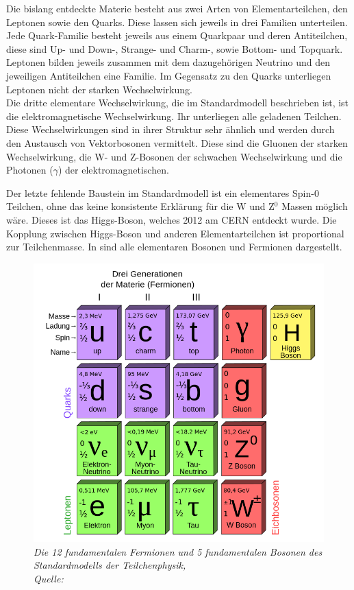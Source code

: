 Die bislang entdeckte Materie besteht aus zwei Arten von Elementarteilchen, den Leptonen sowie den Quarks. Diese lassen sich jeweils in drei Familien unterteilen. Jede Quark-Familie besteht jeweils aus einem Quarkpaar und deren Antiteilchen, diese sind Up- und Down-, Strange- und Charm-, sowie Bottom- und Topquark.\\
Leptonen bilden jeweils zusammen mit dem dazugeh\"origen Neutrino und den jeweiligen Antiteilchen eine Familie. Im Gegensatz zu den Quarks unterliegen Leptonen nicht der starken Wechselwirkung.\\
Die dritte elementare Wechselwirkung, die im Standardmodell beschrieben ist, ist die elektromagnetische Wechselwirkung. Ihr unterliegen alle geladenen Teilchen. Diese Wechselwirkungen sind in ihrer Struktur sehr \"ahnlich und werden durch den Austausch von Vektorbosonen vermittelt. Diese sind die Gluonen der starken Wechselwirkung, die W- und Z-Bosonen der schwachen Wechselwirkung und die Photonen ($\gamma$) der elektromagnetischen. 

Der letzte fehlende Baustein im Standardmodell ist ein elementares Spin-0 Teilchen, ohne das keine konsistente Erkl\"arung f\"ur die W und Z$^0$ Massen m\"oglich w\"are. Dieses ist das Higgs-Boson, welches 2012 am CERN entdeckt wurde. Die Kopplung zwischen Higgs-Boson und anderen Elementarteilchen ist proportional zur Teilchenmasse. In \cite{fig:Standardmodell} sind alle elementaren Bosonen und Fermionen dargestellt.

\begin{figure}[hhh]
 \begin{center}
   \includegraphics[width=\textwidth]{graphics/Standard_Model.png}
   \parbox[b]{12cm}{
     \caption[Standardmodell der Teilchenphysik]
             {\label{fig:Standardmodell} \it Die 12 fundamentalen Fermionen und 5 fundamentalen Bosonen des Standardmodells der Teilchenphysik,\\ Quelle: \cite{wiki:Standardmodell}}
   }
 \end{center}
\end{figure}

